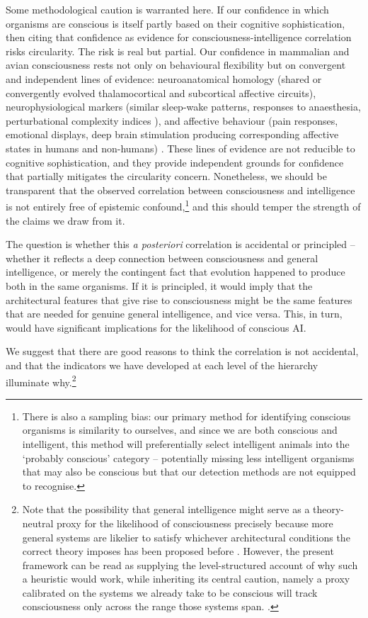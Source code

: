 \documentclass[11pt, a4paper, onecolumn, gdm]{google}
\begin{document}
Some methodological caution is warranted here.
If our confidence in which organisms are conscious is itself partly based on their cognitive sophistication, then citing that confidence as evidence for consciousness-intelligence correlation risks circularity.
The risk is real but partial.
Our confidence in mammalian and avian consciousness rests not only on behavioural flexibility but on convergent and independent lines of evidence: neuroanatomical homology (shared or convergently evolved thalamocortical and subcortical affective circuits), neurophysiological markers (similar sleep-wake patterns, responses to anaesthesia, perturbational complexity indices \citep{casali2013}), and affective behaviour (pain responses, emotional displays, deep brain stimulation producing corresponding affective states in humans and non-humans) \citep{low2012}.
These lines of evidence are not reducible to cognitive sophistication, and they provide independent grounds for confidence that partially mitigates the circularity concern.
Nonetheless, we should be transparent that the observed correlation between consciousness and intelligence is not entirely free of epistemic confound,\footnote{There is also a sampling bias: our primary method for identifying conscious organisms is similarity to ourselves, and since we are both conscious and intelligent, this method will preferentially select intelligent animals into the `probably conscious' category -- potentially missing less intelligent organisms that may also be conscious but that our detection methods are not equipped to recognise.} and this should temper the strength of the claims we draw from it.

The question is whether this \emph{a posteriori} correlation is accidental or principled -- whether it reflects a deep connection between consciousness and general intelligence, or merely the contingent fact that evolution happened to produce both in the same organisms.
If it is principled, it would imply that the architectural features that give rise to consciousness might be the same features that are needed for genuine general intelligence, and vice versa.
This, in turn, would have significant implications for the likelihood of conscious AI.

We suggest that there are good reasons to think the correlation is not accidental, and that the indicators we have developed at each level of the hierarchy illuminate why.\footnote{Note that the possibility that general intelligence might serve as a theory-neutral proxy for the likelihood of consciousness precisely because more general systems are likelier to satisfy whichever architectural conditions the correct theory imposes has been proposed before \citep[see, e.g.,][]{shevlin2020}. However, the present framework can be read as supplying the level-structured account of why such a heuristic would work, while inheriting its central caution, namely a proxy calibrated on the systems we already take to be conscious will track consciousness only across the range those systems span. \citep{shevlin2020}.}
\end{document}
